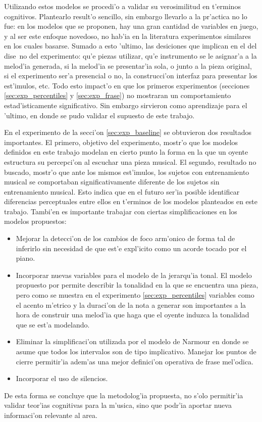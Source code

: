 Utilizando estos modelos se procedi'o a validar su verosimilitud en t'erminos cognitivos. Plantearlo result'o sencillo, sin embargo
llevarlo a la pr'actica no lo fue: en los modelos que se proponen, hay una gran cantidad de variables en juego, y al ser este 
enfoque novedoso, no hab'ia en la literatura experimentos similares en los cuales basarse. Sumado a esto 'ultimo, las desiciones
que implican en el del dise~no del experimento: qu'e piezas utilizar, qu'e instrumento se le asignar'a a la melod'ia generada, 
si la melod'ia se presentar'ia sola, o junto a la pieza original, si el experimento ser'a presencial o no, la construcci'on 
interfaz para presentar los est'imulos, etc.  Todo esto impact'o en que los primeros experimentos (secciones 
\ref{sec:exp_percentiles} y \ref{sec:exp_frase}) no mostraran un comportamiento estad'isticamente significativo. Sin embargo
sirvieron como aprendizaje para el 'ultimo, en donde se pudo validar el supuesto de este trabajo. 

En el experimento de la secci'on \ref{sec:exp_baseline} se obtuvieron dos resultados importantes. El primero, 
objetivo del experimento, mostr'o que los modelos definidos en este trabajo modelan en cierto punto la forma en la que 
un oyente estructura su percepci'on al escuchar una pieza musical. El segundo, resultado no buscado, mostr'o que ante los
mismos est'imulos, los sujetos con entrenamiento musical se comportaban significativamente diferente de los sujetos sin
entrenamiento musical. Esto indica que en el futuro ser'ia posible identificar diferencias perceptuales entre ellos en t'erminos 
de los modelos planteados en este trabajo. Tambi'en es importante trabajar con ciertas simplificaciones en los modelos propuestos:
\begin{itemize}
 \item Mejorar la detecci'on de los cambios de foco arm'onico de forma tal de inferirlo sin necesidad de que est'e expl'icito
 como un acorde tocado por el piano.

 \item Incorporar nuevas variables para el modelo de la jerarqu'ia tonal. El modelo propuesto por \cite{Krumhansl90} permite 
 describir la tonalidad en la que se encuentra una pieza, pero como se muestra en el experimento \ref{sec:exp_percentiles} 
 variables como el acento m'etrico y la duraci'on de la nota a generar son importantes a la hora de construir una melod'ia que 
 haga que el oyente induzca la tonalidad que se est'a modelando.

 \item Eliminar la simplificaci'on utilizada por el modelo de Narmour en donde se asume que todos los intervalos son de tipo
 implicativo. Manejar los puntos de cierre permitir'ia adem'as una mejor definici'on operativa de frase mel'odica.

 \item Incorporar el uso de silencios.

\end{itemize}


De esta forma se concluye que la metodolog'ia propuesta, no s'olo permitir'ia validar teor'ias cognitivas para la m'usica, sino
que podr'ia aportar nueva informaci'on relevante al area. 




